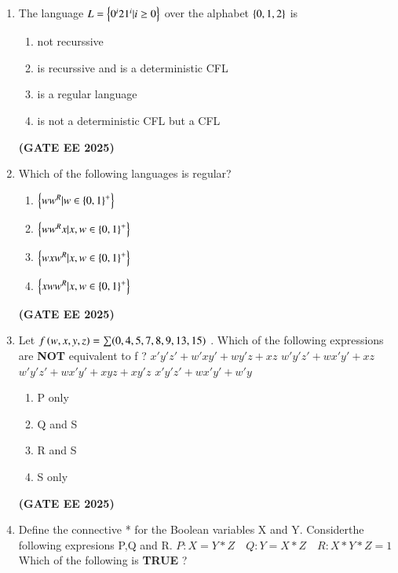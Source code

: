 \documentclass[journal,12pt,onecolumn]{IEEEtran}
\theoremstyle{remark}
\begin{document}
\begin{enumerate}
    \item The language $L= \left\{0^i 2 1^i| i\geq0\right\}$ over the alphabet $\left\{0,1,2\right\}$ is 
    \begin{enumerate}
        \item not recurssive 
        \item is recurssive and is a deterministic CFL
        \item is a regular language
        \item is not a deterministic CFL but a CFL
    \end{enumerate}
    \hfill \textbf{(GATE EE 2025)}
    \item Which of the following languages is regular?
    \begin{enumerate}
        \item $\left\{ww^R |w \in {\ensuremath{\left\{0,1\right\}}}^+\right\}$
        \item $\left\{ww^R x |x,w \in {\ensuremath{\left\{0,1\right\}}}^+\right\}$
        \item $\left\{wxw^R |x,w \in {\ensuremath{\left\{0,1\right\}}}^+\right\}$
        \item $\left\{xww^R |x,w \in {\ensuremath{\left\{0,1\right\}}}^+\right\}$
    \end{enumerate}
    \hfill \textbf{(GATE EE 2025)}
    \item Let $f\left(w,x,y,z\right)=\sum (0,4,5,7,8,9,13,15)$ . Which of the following expressions are \textbf{NOT} equivalent to f ?
    \newline
     $ x'y'z' +w'xy' +wy'z+xz$
    \newline
    $w'y'z'+ wx'y'+xz$
    \newline
     $w'y'z' +wx'y' +xyz +xy'z$
    \newline
    $x'y'z' +wx'y' +w'y$
\begin{enumerate}
    \item P only
    \item Q and S 
    \item R and S
    \item S only
\end{enumerate}    
\hfill \textbf{(GATE EE 2025)}
    \item Define the connective * for the Boolean variables X and Y. Considerthe following expresions P,Q and R.
    \newline 
    $P: X=Y*Z \quad  Q:Y=X*Z \quad R:X*Y*Z=1$
    \newline
    Which of the following is \textbf{TRUE} ?
    \begin{enumerate}
    \begin{multicols}{2}
        

\end{multicols}
\end{enumerate}
\end{enumerate}
\end{document}
